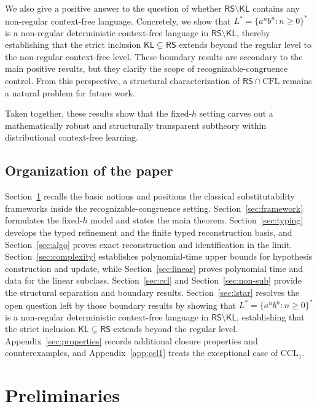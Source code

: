 \documentclass[11pt,a4paper]{article}
\begin{document}
We also give a positive answer to the question of whether $\mathsf{RS}\setminus\mathsf{KL}$ contains any non-regular context-free language. Concretely, we show that $L^*=\{a^n b^n:n\geq 0\}^*$ is a non-regular deterministic context-free language in $\mathsf{RS}\setminus\mathsf{KL}$, thereby establishing that the strict inclusion $\mathsf{KL}\subsetneq\mathsf{RS}$ extends beyond the regular level to the non-regular context-free level. These boundary results are secondary to the main positive results, but they clarify the scope of recognizable-congruence control. From this perspective, a structural characterization of $\mathsf{RS}\cap\mathrm{CFL}$ remains a natural problem for future work.

Taken together, these results show that the fixed-$h$ setting carves out a mathematically robust and structurally transparent subtheory within distributional context-free learning.

\subsection{Organization of the paper}
Section~\ref{sec:prelim} recalls the basic notions and positions the
classical substitutability frameworks inside the recognizable-congruence
setting. Section~\ref{sec:framework} formulates the fixed-$h$ model and
states the main theorem. Section~\ref{sec:typing} develops the typed
refinement and the finite typed reconstruction basis, and
Section~\ref{sec:algo} proves exact reconstruction and identification in
the limit. Section~\ref{sec:complexity} establishes polynomial-time upper
bounds for hypothesis construction and update, while Section~\ref{sec:linear}
proves polynomial time and data for the linear subclass.
Section~\ref{sec:ccl} and Section~\ref{sec:non-sub} provide the
structural separation and boundary results. Section~\ref{sec:lstar} resolves
the open question left by those boundary results by showing that
$L^*=\{a^nb^n:n\geq 0\}^*$ is a non-regular deterministic context-free
language in $\mathsf{RS}\setminus\mathsf{KL}$, establishing that the strict
inclusion $\mathsf{KL}\subsetneq\mathsf{RS}$ extends beyond the regular
level. Appendix~\ref{sec:properties} records additional closure properties
and counterexamples, and Appendix~\ref{app:ccl1} treats the exceptional
case of $\mathrm{CCL}_1$.

\section{Preliminaries}
\label{sec:prelim}
\end{document}
